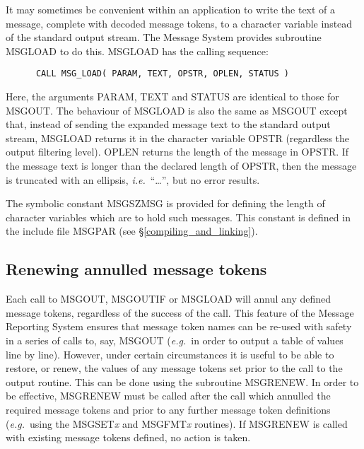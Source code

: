 \documentclass[twoside,11pt]{article}
\newcommand{\htmlref}[2]{#1}
\newcommand{\latex}[1]{#1}
\newcommand{\xlabel}[1]{}
\renewcommand{\_}{\texttt{\symbol{95}}}
\begin{document}
It may sometimes be convenient within an application to write the text of a 
message, complete with decoded message tokens, to a character variable 
instead of the standard output stream.
The Message System provides subroutine MSG\_LOAD to do this.
MSG\_LOAD has the calling sequence:

\begin {small}
\begin{verbatim}
      CALL MSG_LOAD( PARAM, TEXT, OPSTR, OPLEN, STATUS )
\end{verbatim}
\end {small}

Here, the arguments PARAM, TEXT and STATUS are identical to those for MSG\_OUT.
The behaviour of MSG\_LOAD is also the same as MSG\_OUT except that, instead of
sending the expanded message text to the standard output stream, MSG\_LOAD
returns it in the character variable OPSTR (regardless the output filtering
level).
OPLEN returns the length of the message in OPSTR.
If the message text is longer than the declared length of OPSTR, then the
message is truncated with an ellipsis, \textit{i.e.}\ ``\ldots'', but no error 
results.

The symbolic constant MSG\_\_SZMSG is provided for defining the length of 
character variables which are to hold such messages.
This constant is defined in the include file 
\htmlref
{MSG\_PAR}{compiling_and_linking}\latex{ (see \S\ref{compiling_and_linking})}.


\subsection{\xlabel{renewing_annulled_message_tokens}Renewing annulled message tokens}

Each call to MSG\_OUT, MSG\_OUTIF or MSG\_LOAD will annul any defined message 
tokens, regardless of the success of the call.
This feature of the Message Reporting System ensures that message token names
can be re-used with safety in a series of calls to, say, MSG\_OUT (\textit{e.g.}\ 
in order to output a table of values line by line).
However, under certain circumstances it is useful to be able to restore, or 
renew, the values of any message tokens set prior to the call to the output
routine. This can be done using the subroutine MSG\_RENEW.
In order to be effective, MSG\_RENEW must be called after the call
which annulled the required message tokens and prior to any further message
token  definitions (\textit{e.g.}\ using the MSG\_SET\textit{x} and MSG\_FMT\textit{x} 
routines). 
If MSG\_RENEW is called with existing message tokens defined, no action is
taken.
\end{document}
